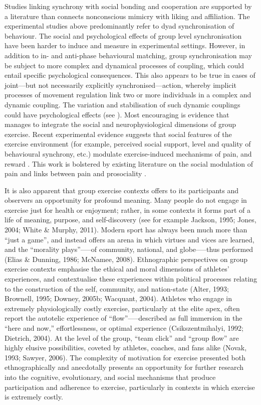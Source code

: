 Studies linking synchrony with social bonding and cooperation are supported by a literature than connects nonconscious mimicry with liking and affiliation\citep{VanBaaren2009}.  The experimental studies above predominantly refer to dyad synchronisation of behaviour.  The social and psychological effects of group level synchronisation have been harder to induce and measure in experimental settings. However, in addition to in- and anti-phase behavioural matching, group synchronisation may be subject to more complex and dynamical processes of coupling, which could entail specific psychological consequences. This also appears to be true in cases of joint---but not necessarily explicitly synchronised---action, whereby implicit processes of movement regulation link two or more individuals in a complex and dynamic coupling. The variation and stabilisation of such dynamic couplings could have psychological effects (see \citep{Schmidt2008,Marsh2009a}).  Most encouraging is evidence that manages
to integrate the social and neurophysiological dimensions of group exercise.  Recent experimental evidence suggests that social features of the exercise environment (for example, perceived social support, level and quality of behavioural synchrony, etc.) modulate exercise-induced mechanisms of pain, and reward \citep{Cohen2009,Sullivan2014,Tarr2015,Davis2015,Weinstein2016}. This work is bolstered by existing literature on the social modulation of pain \citep{Eisenberger2012a} and links between pain and prosociality \citep{Bastian2014a}.

It is also apparent that group exercise contexts offers to its participants and observers an opportunity for profound meaning.  Many people do not engage in exercise just for health or enjoyment; rather, in some contexts it forms part of a life of meaning, purpose, and self-discovery (see for example Jackson, 1995; Jones, 2004; White \& Murphy, 2011). Modern sport has always been much more than ``just a game'', and instead offers an arena in which virtues and vices are learned, and the ``morality plays''—--of community, national, and globe—--thus performed (Elias \& Dunning, 1986; McNamee, 2008).  Ethnographic perspectives on group exercise contexts emphasise the ethical and moral dimensions of athletes’ experiences, and contextualise these experiences within political processes relating to the construction of the self, community, and nation-state (Alter, 1993; Brownell, 1995; Downey, 2005b; Wacquant, 2004).  Athletes who engage in extremely physiologically costly exercise, particularly at the elite apex, often report the autotelic experience of ``flow''—--described as full immersion in the ``here and now,'' effortlessness, or optimal experience (Csikszentmihalyi, 1992; Dietrich, 2004).  At the level of the group, ``team click'' and ``group flow'' are highly elusive possibilities, coveted by athletes, coaches, and fans alike (Novak, 1993; Sawyer, 2006).  The complexity of motivation for exercise presented both ethnographically and anecdotally presents an opportunity for further research into the cognitive, evolutionary, and social mechanisms that produce participation and adherence to exercise, particularly in contexts in which exercise is extremely costly.


